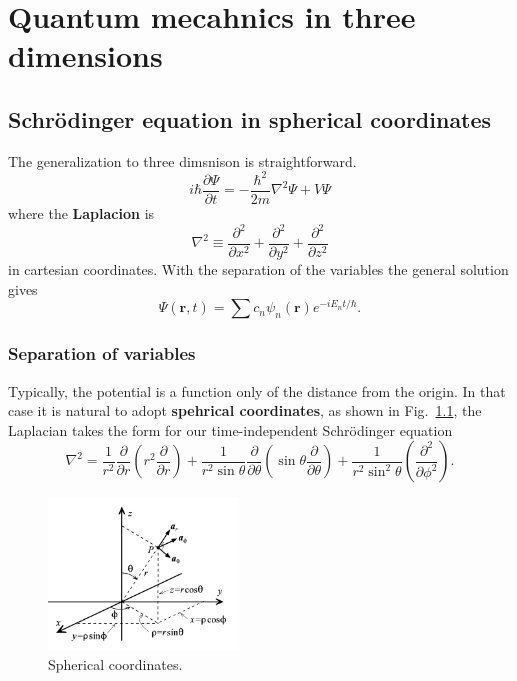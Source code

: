 \chapter{Quantum mecahnics in three dimensions}
\section{Schr\"odinger equation in spherical coordinates}
The generalization to three dimsnison is straightforward.
\begin{equation}
  \label{eq:4-1}
  i\hbar \frac{\partial \Psi}{\partial t} = - \frac{\hbar^{2}}{2m} \nabla^{2} \Psi + V\Psi
\end{equation}
where the \textbf{Laplacion} is
\begin{equation}
  \label{eq:4-2}
  \nabla^{2} \equiv \frac{\partial^{2}}{\partial x^{2}} + \frac{\partial^{2}}{\partial y^{2}} + \frac{\partial^{2}}{\partial z^{2}}
\end{equation}
in cartesian coordinates.
With the separation of the variables the general solution gives
\begin{equation}
  \label{eq:4-3}
  \Psi \left( \mathbf{r},t \right) = \sum c_{n} \psi_{n} \left( \mathbf{r} \right) e^{-i E_{n}t/\hbar}.
\end{equation}

\subsection{Separation of variables}
Typically, the potential is a function only of the distance from the origin.
In that case it is natural to adopt \textbf{spehrical coordinates}, as shown in Fig.~\ref{fig:4-1}, the Laplacian takes the form for our time-independent Schr\"odinger equation
\begin{equation}
  \label{eq:4-4}
  \nabla^{2} = \frac{1}{r^{2}} \frac{\partial }{\partial r} \left( r^{2} \frac{\partial}{\partial r} \right) + \frac{1}{r^{2}\sin\theta} \frac{\partial}{\partial \theta} \left( \sin\theta \frac{\partial}{\partial \theta} \right) + \frac{1}{r^{2} \sin^{2} \theta} \left( \frac{\partial^{2}}{\partial \phi^{2}} \right).
\end{equation}
\begin{figure}[h]
  \centering
  \includegraphics[width=0.45\textwidth]{fig/fig4-1.png}
  \caption{Spherical coordinates.}
  \label{fig:4-1}
\end{figure}

